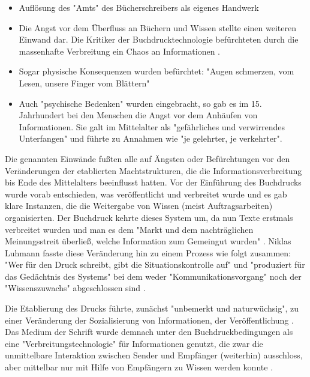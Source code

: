 \begin{itemize}
\item Auflösung des "Amts" des Bücherschreibers als eigenes Handwerk
\item Die Angst vor dem Überfluss an Büchern und Wissen stellte einen weiteren Einwand dar. Die Kritiker der Buchdrucktechnologie befürchteten  durch die massenhafte Verbreitung ein Chaos an Informationen \cite{giesecke_1991_buchdruck}.
\item Sogar physische Konsequenzen wurden befürchtet: "Augen schmerzen, vom Lesen, unsere Finger vom Blättern" \cite{giesecke_1991_buchdruck}
\item Auch "psychische Bedenken" wurden eingebracht, so gab es im 15. Jahrhundert bei den Menschen die Angst vor dem Anhäufen von Informationen. Sie galt im Mittelalter als "gefährliches und verwirrendes Unterfangen" und führte zu Annahmen wie "je gelehrter, je verkehrter". \cite{giesecke_1991_buchdruck}
\end{itemize}

Die genannten Einwände fußten alle auf Ängsten oder Befürchtungen vor den Veränderungen der etablierten Machtstrukturen, die die Informationsverbreitung bis Ende des Mittelalters beeinflusst hatten. Vor der Einführung des Buchdrucks wurde vorab entschieden, was veröffentlicht und verbreitet wurde und es gab klare Instanzen, die die Weitergabe von Wissen (meist Auftragsarbeiten) organisierten. Der Buchdruck kehrte dieses System um, da nun Texte erstmals verbreitet wurden und man es dem "Markt und dem nachträglichen Meinungsstreit überließ, welche Information zum Gemeingut wurden" \cite{giesecke_1991_buchdruck}. Niklas Luhmann fasste diese Veränderung hin zu einem Prozess wie folgt zusammen: "Wer für den Druck schreibt, gibt die Situationskontrolle auf" und "produziert für das Gedächtnis des Systems" bei dem weder "Kommunikationsvorgang" noch der "Wissenszuwachs" abgeschlossen sind \cite{Luhmann1998}.

Die Etablierung des Drucks führte, zunächst "unbemerkt und naturwüchsig", zu einer Veränderung der Sozialisierung von Informationen, der Veröffentlichung \cite{giesecke_1991_buchdruck}. Das Medium der Schrift wurde demnach unter den Buchdruckbedingungen als eine "Verbreitungstechnologie" für Informationen genutzt, die zwar die unmittelbare Interaktion zwischen Sender und Empfänger (weiterhin) ausschloss, aber mittelbar nur mit Hilfe von Empfängern zu Wissen werden konnte \cite{Luhmann1998}.

